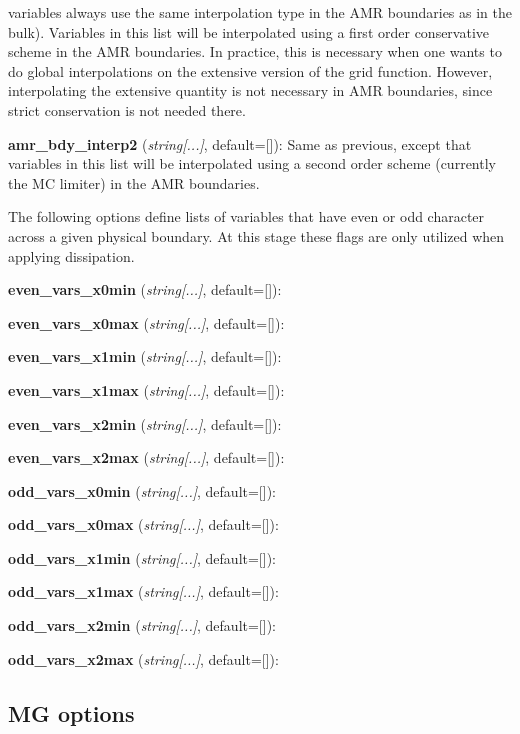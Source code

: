 \documentclass[aps,amssymb,unsortedaddress,nofootinbib]{revtex4}
\def\lsep{\itemsep 0.05in}
\begin{document}
\begin{list}{}{\lsep}
      variables always use the same interpolation type
      in the AMR boundaries as in the bulk).
      Variables in this list will be interpolated using a first order
      conservative scheme in the AMR boundaries.  In practice, this is
      necessary when one wants to do global interpolations on the extensive
      version of the grid function.  However, interpolating the extensive
      quantity is not necessary in AMR boundaries, since strict conservation
      is not needed there.  
\item {\bf amr\_bdy\_interp2} ({\em string[...]}, default=[]):
      Same as previous, except that variables in this list will be interpolated 
      using a second order scheme (currently the MC limiter) in the AMR boundaries.  

\end{list}

The following options define lists of variables that have even or odd character
across a given physical boundary. At this stage these flags are only utilized
when applying dissipation.

\begin{list}{}{\lsep}
\item {\bf even\_vars\_x0min} ({\em string[...]}, default=[]):
\item {\bf even\_vars\_x0max} ({\em string[...]}, default=[]):
\item {\bf even\_vars\_x1min} ({\em string[...]}, default=[]):
\item {\bf even\_vars\_x1max} ({\em string[...]}, default=[]):
\item {\bf even\_vars\_x2min} ({\em string[...]}, default=[]):
\item {\bf even\_vars\_x2max} ({\em string[...]}, default=[]):
\item {\bf odd\_vars\_x0min} ({\em string[...]}, default=[]):
\item {\bf odd\_vars\_x0max} ({\em string[...]}, default=[]):
\item {\bf odd\_vars\_x1min} ({\em string[...]}, default=[]):
\item {\bf odd\_vars\_x1max} ({\em string[...]}, default=[]):
\item {\bf odd\_vars\_x2min} ({\em string[...]}, default=[]):
\item {\bf odd\_vars\_x2max} ({\em string[...]}, default=[]):
\end{list}


\subsection{MG options}
\end{document}
